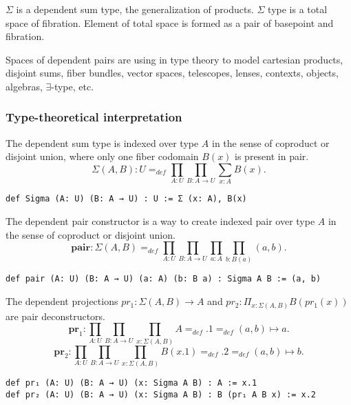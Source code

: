 \documentclass{article}
\begin{document}
$\Sigma$ is a dependent sum type, the generalization of products.
$\Sigma$ type is a total space of fibration. Element of total
space is formed as a pair of basepoint and fibration.

Spaces of dependent pairs are using in type theory to model
cartesian products, disjoint sums, fiber bundles, vector spaces,
telescopes, lenses, contexts, objects, algebras, $\exists$-type, etc.

\subsubsection*{Type-theoretical interpretation}

\begin{definition}
The dependent sum type is indexed over type $A$ in the sense of coproduct or disjoint union,
where only one fiber codomain $B(x)$ is present in pair.
$$
   \Sigma(A,B) : U =_{def} \prod_{A:U}\prod_{B: A \rightarrow U }\sum_{x:A} B(x).
$$
\begin{lstlisting}[mathescape=true]
def Sigma (A: U) (B: A → U) : U := Σ (x: A), B(x)
\end{lstlisting}
\end{definition}

\begin{definition} 
The dependent pair constructor is a way to create indexed pair over type $A$
in the sense of coproduct or disjoint union.
$$
  \mathbf{pair} : \Sigma(A,B) =_{def} \prod_{A:U}\prod_{B:A \rightarrow U}\prod_{a:A}\prod_{b:B(a)} (a,b).
$$
\begin{lstlisting}
def pair (A: U) (B: A → U) (a: A) (b: B a) : Sigma A B := (a, b)
\end{lstlisting}
\end{definition}

\begin{definition} 
The dependent projections
$pr_{1}: \Sigma(A,B) \rightarrow A$ and
$pr_{2}: \Pi_{x: \Sigma(A,B)} B(pr_{1}(x))$ are pair deconstructors.
$$
  \mathbf{pr}_1 : \prod_{A:U} \prod_{B:A \rightarrow U} \prod_{x: \Sigma(A,B)} A
  =_{def} .1 =_{def} (a,b) \mapsto a.
$$
$$
  \mathbf{pr}_2 : \prod_{A:U} \prod_{B:A \rightarrow U} \prod_{x: \Sigma(A,B)} B(x.1)
  =_{def} .2 =_{def} (a,b) \mapsto b.
$$
\begin{lstlisting}[mathescape=true]
def pr₁ (A: U) (B: A → U) (x: Sigma A B) : A := x.1
def pr₂ (A: U) (B: A → U) (x: Sigma A B) : B (pr₁ A B x) := x.2
\end{lstlisting}
\end{definition}
\end{document}
